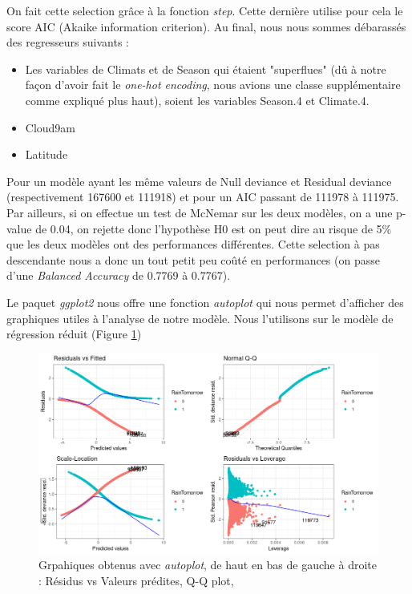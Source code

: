 \documentclass{article}
\begin{document}
On fait cette selection grâce à la fonction \emph{step}. Cette dernière utilise pour cela le score AIC (Akaike information criterion). Au final, nous nous sommes débarassés des regresseurs suivants : 

\begin{itemize}
    \item Les variables de Climats et de Season qui étaient "superflues" (dû à notre façon d'avoir fait le \emph{one-hot encoding}, nous avions une classe supplémentaire comme expliqué plus haut), soient les variables Season.4 et Climate.4. 
    \item Cloud9am
    \item Latitude
\end{itemize}

Pour un modèle ayant les même valeurs de Null deviance et Residual deviance (respectivement 167600 et 111918) et pour un AIC passant de 111978 à 111975. Par ailleurs, si on effectue un test de McNemar sur les deux modèles, on a une p-value de 0.04, on rejette donc l'hypothèse H0 est on peut dire au risque de 5\% que les deux modèles ont des performances différentes. Cette selection à pas descendante nous a donc un tout petit peu coûté en performances (on passe d'une \emph{Balanced Accuracy} de 0.7769 à 0.7767).

Le paquet \emph{ggplot2} nous offre une fonction \emph{autoplot} qui nous permet d'afficher des graphiques utiles à l'analyse de notre modèle. Nous l'utilisons sur le modèle de régression réduit (Figure \ref{fig:autoplot_glm})

\begin{figure}[htp]
    \centering
    \includegraphics[width=\textwidth]{Images/autoplot_glm.png}
    \caption{Grpahiques obtenus avec \emph{autoplot}, de haut en bas de gauche à droite : Résidus vs Valeurs prédites, Q-Q plot, }
    \label{fig:autoplot_glm}
\end{figure}
\end{document}
